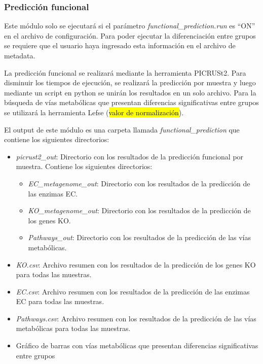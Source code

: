\subsubsection{Predicción funcional}
Este módulo solo se ejecutará si el parámetro \textit{functional\_prediction.run} es ``ON'' en el archivo de configuración. 
Para poder ejecutar la diferenciación entre grupos se requiere que el usuario haya ingresado esta información en el archivo de metadata.

La predicción funcional se realizará mediante la herramienta PICRUSt2. 
Para disminuir los tiempos de ejecución, se realizará la predicción por muestra y luego mediante un script en python se unirán los resultados en un solo archivo.
Para la búsqueda de vías metabólicas que presentan diferencias significativas entre grupos se utilizará la herramienta Lefse (\hl{valor de normalización}).

El output de este módulo es una carpeta llamada \textit{functional\_prediction} que contiene los siguientes directorios:
\begin{itemize}
    \item \textit{picrust2\_out}: Directorio con los resultados de la predicción funcional por muestra. Contiene los siguientes directorios:
    \begin{itemize}
        \item \textit{EC\_metagenome\_out}: Directorio con los resultados de la predicción de las enzimas EC.
        \item \textit{KO\_metagenome\_out}: Directorio con los resultados de la predicción de los genes KO.
        \item \textit{Pathways\_out}: Directorio con los resultados de la predicción de las vías metabólicas.
    \end{itemize}
    \item \textit{KO.csv}: Archivo resumen con los resultados de la predicción de los genes KO para todas las muestras.
    \item \textit{EC.csv}: Archivo resumen con los resultados de la predicción de las enzimas EC para todas las muestras.
    \item \textit{Pathways.csv}: Archivo resumen con los resultados de la predicción de las vías metabólicas para todas las muestras.
    \item Gráfico de barras con vías metabólicas que presentan diferencias significativas entre grupos
    \end{itemize}

